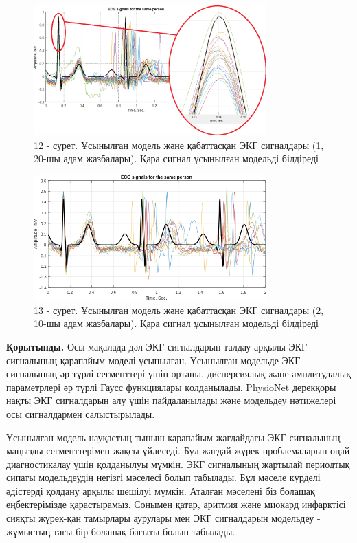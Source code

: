 \begin{figure}[H]
	\centering
	\includegraphics[width=0.8\textwidth]{media/ict/image52}
	\caption*{12 - сурет. Ұсынылған модель және қабаттасқан ЭКГ сигналдары (1, 20-шы адам жазбалары). Қара сигнал ұсынылған модельді білдіреді}
\end{figure}

\begin{figure}[H]
	\centering
	\includegraphics[width=0.8\textwidth]{media/ict/image53}
	\caption*{13 - сурет. Ұсынылған модель және қабаттасқан ЭКГ сигналдары (2, 10-шы адам жазбалары). Қара сигнал ұсынылған модельді білдіреді}
\end{figure}

\begin{multicols}{2}
{\bfseries Қорытынды.} Осы мақалада дәл ЭКГ сигналдарын талдау арқылы ЭКГ
сигналының қарапайым моделі ұсынылған. Ұсынылған модельде ЭКГ сигналының
әр түрлі сегменттері үшін орташа, дисперсиялық және амплитудалық
параметрлері әр түрлі Гаусс функциялары қолданылады. PhysioNet дерекқоры
нақты ЭКГ сигналдарын алу үшін пайдаланылады және модельдеу нәтижелері
осы сигналдармен салыстырылады.

Ұсынылған модель науқастың тыныш қарапайым жағдайдағы ЭКГ сигналының
маңызды сегменттерімен жақсы үйлеседі. Бұл жағдай жүрек проблемаларын
оңай диагностикалау үшін қолданылуы мүмкін. ЭКГ сигналының жартылай
периодтық сипаты модельдеудің негізгі мәселесі болып табылады. Бұл
мәселе күрделі әдістерді қолдану арқылы шешілуі мүмкін. Аталған мәселені
біз болашақ еңбектерімізде қарастырамыз. Сонымен қатар, аритмия және
миокард инфарктісі сияқты жүрек-қан тамырлары аурулары мен ЭКГ
сигналдарын модельдеу - жұмыстың тағы бір болашақ бағыты болып табылады.
\end{multicols}


